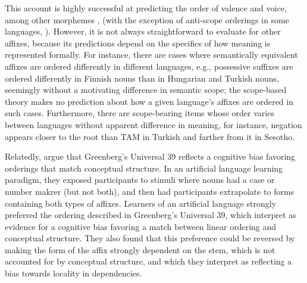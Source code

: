 \documentclass[11pt,letterpaper]{article}
\newcommand{\citep}{\parencite}
\newcommand{\citet}{\Textcite}
\begin{document}
This account is highly successful at predicting the order of valence and voice, among other morphemes \citep[e.g.,][]{rice2000morpheme, caballero2010scope,  narrog2010the, korotkova2010deriving}, (with the exception of anti-scope orderings in some languages, \citep{Hyman2003}).
However, it is not always straightforward to evaluate for other affixes, because its predictions depend on the specifics of how meaning is represented formally.
For instance, there are cases where semantically equivalent affixes are ordered differently in different languages, e.g., possessive suffixes are ordered differently in Finnish nouns than in Hungarian and Turkish nouns, seemingly without a motivating difference in semantic scope; the scope-based theory makes no prediction about how a given language's affixes are ordered in such cases.
Furthermore, there are scope-bearing items whose order varies between languages without apparent difference in meaning, for instance, negation appears closer to the root than TAM in Turkish and farther from it in Sesotho.

Relatedly, \citet{saldana2021cross} argue that Greenberg's Universal 39 reflects a cognitive bias favoring orderings that match conceptual structure.
In an artificial language learning paradigm, they exposed participants to stimuli where nouns had a case or number makrer (but not both), and then had participants extrapolate to forms containing both types of affixes.
Learners of an artificial language strongly preferred the ordering described in Greenberg's Universal 39, which \citet{saldana2021cross} interpret as evidence for a cognitive bias favoring a match between linear ordering and conceptual structure.
They also found that this preference could be reversed by making the form of the affix strongly dependent on the stem, which is not accounted for by conceptual structure, and which they interpret as reflecting a bias towards locality in dependencies.


\end{document}
